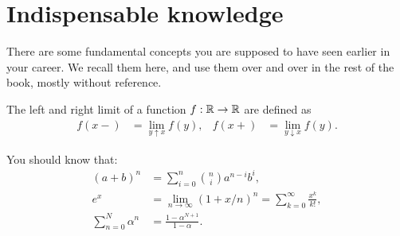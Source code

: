 \documentclass[queueing-book.tex]{subfiles}
\begin{document}
\section{Indispensable knowledge}
\label{sec:indep-knowl}




There are some fundamental concepts you are supposed to have seen earlier in your career.
We recall them here, and use them over and over in the rest of the book, mostly without reference.


The left and right limit of a function $f: \mathbb{R}\to \mathbb{R}$ are defined as
 \begin{align}
 f(x-) &= \lim_{y\uparrow x} f(y), &
 f(x+) &= \lim_{y\downarrow x} f(y).\label{eq:5}
\end{align}



You should know that:
\begin{subequations}
 \begin{align}
 (a+b)^n &= \sum_{i=0}^n {n \choose i} a^{n-i} b^i, \label{eq:71}\\
e^x &= \lim_{n\to\infty} (1+x/n)^n = \sum_{k=0}^{\infty} \frac{x^k}{k!}, \label{eq:76}\\
 \sum_{n=0}^N \alpha^n &= \frac{1-\alpha^{N+1}}{1-\alpha}. \label{eq:61}
\end{align}
\end{subequations}
\end{document}
